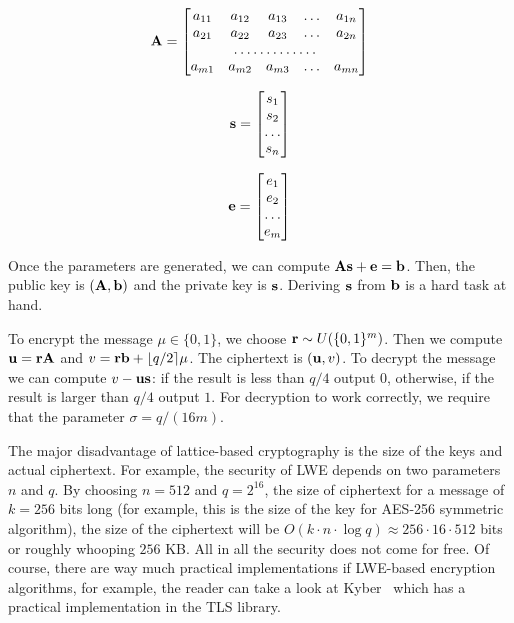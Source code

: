 \begin{equation}
 {\bf A}=\begin{bmatrix}
 a_{11}       & a_{12} & a_{13} & \dots & a_{1n} \\
 a_{21}       & a_{22} & a_{23} & \dots & a_{2n} \\
 \hdotsfor{5} \\
 a_{m1}       & a_{m2} & a_{m3} & \dots & a_{mn}
    \end{bmatrix}
\end{equation}

\begin{equation}
 {\bf s}=\begin{bmatrix}
 s_{1} \\
 s_{2} \\
 \dots \\
 s_{n} 
    \end{bmatrix}
\end{equation}

\begin{equation}
 {\bf e}=\begin{bmatrix}
 e_{1} \\
 e_{2} \\
 \dots \\
 e_{m} 
    \end{bmatrix}
\end{equation}

Once the parameters are generated, we can compute ${\bf As}+{\bf e} = {\bf b}$. Then, the public 
key is $({\bf A, b})$ and the private key is ${\bf s}$. Deriving ${\bf s}$ from ${\bf b}$ is a hard 
task at hand.

To encrypt the message $\mu \in \{0, 1\}$, we choose ${\bf r} \sim U(\{0, 1\}^m)$. Then we compute ${\bf u}={\bf rA}$ and 
$v={\bf rb}+\lfloor q/2 \rceil \mu$. The ciphertext is $({\bf u}, v)$. To decrypt the message we can 
compute $v - \bf{u s}$: if the result is less than $q/4$ output $0$, otherwise, if the result
is larger than $q/4$ output $1$. For decryption to work correctly, we require that the parameter $\sigma = q/(16m)$. 

The major disadvantage of lattice-based cryptography is the size of the keys and actual ciphertext. For example,
the security of LWE depends on two parameters $n$ and $q$. By choosing $n=512$ and $q=2^{16}$, the size of ciphertext
for a message of $k=256$ bits long (for example, this is the size of the key for AES-256 symmetric algorithm), 
the size of the ciphertext will be $O(k \cdot n \cdot \log q) \approx 256 \cdot 16 \cdot 512$ bits or roughly whooping 
$256$ KB. All in all the security does not come for free. Of course, there are way much practical implementations
if LWE-based encryption algorithms, for example, the reader can take a look at Kyber~\cite{nist:kyber} which has a practical 
implementation in the TLS library.

